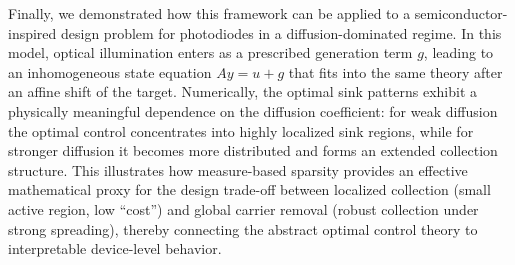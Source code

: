 \documentclass[11pt,a4paper]{article}
\begin{document}
Finally, we demonstrated how this framework can be applied to a semiconductor-inspired design problem for photodiodes in a diffusion-dominated regime. In this model, optical illumination enters as a prescribed generation term $g$, leading to an inhomogeneous state equation $Ay=u+g$ that fits into the same theory after an affine shift of the target. Numerically, the optimal sink patterns exhibit a physically meaningful dependence on the diffusion coefficient: for weak diffusion the optimal control concentrates into highly localized sink regions, while for stronger diffusion it becomes more distributed and forms an extended collection structure. This illustrates how measure-based sparsity provides an effective mathematical proxy for the design trade-off between localized collection (small active region, low “cost”) and global carrier removal (robust collection under strong spreading), thereby connecting the abstract optimal control theory to interpretable device-level behavior.



\end{document}
